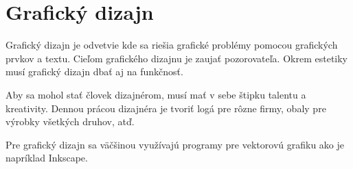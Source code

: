\documentclass[11pt,a4paper]{article}
\begin{document}
\section{Grafický dizajn} 
Grafický dizajn je odvetvie kde sa riešia grafické problémy pomocou grafických prvkov a textu. Cieľom grafického dizajnu je zaujať pozorovateľa. Okrem estetiky musí grafický dizajn dbať aj na funkčnosť.\cite{htmlgrafika}


Aby sa mohol stať človek dizajnérom, musí mať v sebe štipku talentu a kreativity. Dennou prácou dizajnéra je tvoriť logá pre rôzne firmy, obaly pre výrobky všetkých druhov, atď.\cite{asdf}


Pre grafický dizajn sa väčšinou využívajú programy pre vektorovú grafiku ako je napríklad Inkscape.\cite{grsw}
\newpage
\raggedright

\end{document}
